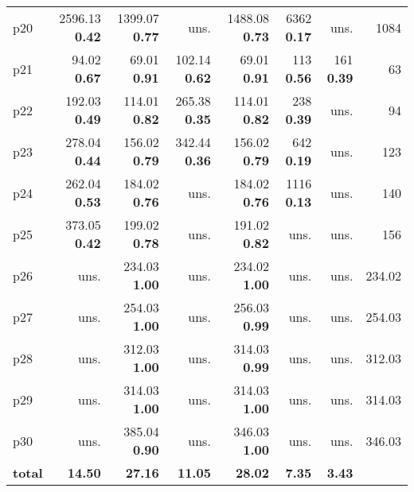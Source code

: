 \begin{tabular}{lrrrrrrr}
\multicolumn{1}{l|}{p20} & {\footnotesize 2596.13} \textbf{0.42} & {\footnotesize 1399.07} \textbf{0.77} & uns. & {\footnotesize 1488.08} \textbf{0.73} & {\footnotesize 6362} \textbf{0.17} & uns. & \multicolumn{1}{|r}{1084}\\
\multicolumn{1}{l|}{p21} & {\footnotesize 94.02} \textbf{0.67} & {\footnotesize 69.01} \textbf{0.91} & {\footnotesize 102.14} \textbf{0.62} & {\footnotesize 69.01} \textbf{0.91} & {\footnotesize 113} \textbf{0.56} & {\footnotesize 161} \textbf{0.39} & \multicolumn{1}{|r}{63}\\
\multicolumn{1}{l|}{p22} & {\footnotesize 192.03} \textbf{0.49} & {\footnotesize 114.01} \textbf{0.82} & {\footnotesize 265.38} \textbf{0.35} & {\footnotesize 114.01} \textbf{0.82} & {\footnotesize 238} \textbf{0.39} & uns. & \multicolumn{1}{|r}{94}\\
\multicolumn{1}{l|}{p23} & {\footnotesize 278.04} \textbf{0.44} & {\footnotesize 156.02} \textbf{0.79} & {\footnotesize 342.44} \textbf{0.36} & {\footnotesize 156.02} \textbf{0.79} & {\footnotesize 642} \textbf{0.19} & uns. & \multicolumn{1}{|r}{123}\\
\multicolumn{1}{l|}{p24} & {\footnotesize 262.04} \textbf{0.53} & {\footnotesize 184.02} \textbf{0.76} & uns. & {\footnotesize 184.02} \textbf{0.76} & {\footnotesize 1116} \textbf{0.13} & uns. & \multicolumn{1}{|r}{140}\\
\multicolumn{1}{l|}{p25} & {\footnotesize 373.05} \textbf{0.42} & {\footnotesize 199.02} \textbf{0.78} & uns. & {\footnotesize 191.02} \textbf{0.82} & uns. & uns. & \multicolumn{1}{|r}{156}\\
\multicolumn{1}{l|}{p26} & uns. & {\footnotesize 234.03} \textbf{1.00} & uns. & {\footnotesize 234.02} \textbf{1.00} & uns. & uns. & \multicolumn{1}{|r}{234.02}\\
\multicolumn{1}{l|}{p27} & uns. & {\footnotesize 254.03} \textbf{1.00} & uns. & {\footnotesize 256.03} \textbf{0.99} & uns. & uns. & \multicolumn{1}{|r}{254.03}\\
\multicolumn{1}{l|}{p28} & uns. & {\footnotesize 312.03} \textbf{1.00} & uns. & {\footnotesize 314.03} \textbf{0.99} & uns. & uns. & \multicolumn{1}{|r}{312.03}\\
\multicolumn{1}{l|}{p29} & uns. & {\footnotesize 314.03} \textbf{1.00} & uns. & {\footnotesize 314.03} \textbf{1.00} & uns. & uns. & \multicolumn{1}{|r}{314.03}\\
\multicolumn{1}{l|}{p30} & uns. & {\footnotesize 385.04} \textbf{0.90} & uns. & {\footnotesize 346.03} \textbf{1.00} & uns. & uns. & \multicolumn{1}{|r}{346.03}\\
\midrule
\textbf{total} & \textbf{14.50} & \textbf{27.16} & \textbf{11.05} & \textbf{28.02} & \textbf{7.35} & \textbf{3.43} & \\
\bottomrule
\end{tabular}

